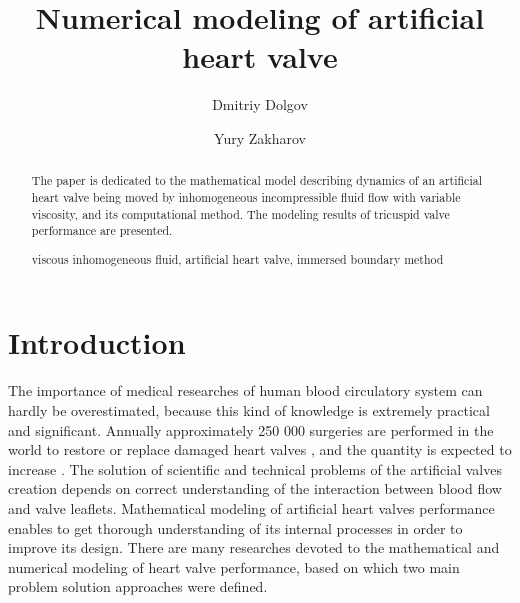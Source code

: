 \documentclass[runningheads,a4paper]{llncs}
\newcommand{\keywords}[1]{\par\addvspace\baselineskip
\noindent\keywordname\enspace\ignorespaces#1}
\begin{document}
\mainmatter  %

\title{Numerical modeling of artificial heart valve}


%
%
\author{Dmitriy Dolgov \and Yury Zakharov}
%


%
%

\maketitle


\begin{abstract}
    The paper is dedicated to the mathematical model describing dynamics of
    an artificial heart valve being moved by inhomogeneous incompressible fluid flow
    with variable viscosity, and its computational method. The modeling results of
    tricuspid valve performance are presented.
\keywords{viscous inhomogeneous fluid, artificial heart valve, immersed boundary method}
\end{abstract}


\section{Introduction}
The importance of medical researches of human blood circulatory system can hardly be overestimated,
because this kind of knowledge is extremely practical and significant. Annually approximately 250 000
surgeries are performed in the world to restore or replace damaged heart valves \cite{yoganathan}, and the
quantity is expected to increase \cite{yacoub}. The solution of scientific and technical problems of the artificial valves 
creation depends on correct understanding of the interaction between blood flow and valve leaflets. Mathematical modeling
of artificial heart valves performance enables to get thorough understanding of its internal processes in order to improve its design.
There are many researches devoted to the mathematical and numerical modeling
of heart valve performance, based on which two main problem solution approaches were defined.
\end{document}
